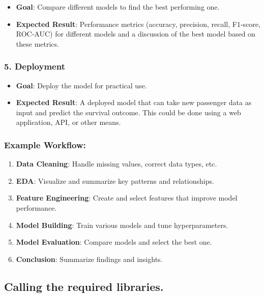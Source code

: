 \documentclass[
]{article}
\providecommand{\tightlist}{%
  \setlength{\itemsep}{0pt}\setlength{\parskip}{0pt}}
\begin{document}
\begin{itemize}
\tightlist
\item
  \textbf{Goal}: Compare different models to find the best performing
  one.
\item
  \textbf{Expected Result}: Performance metrics (accuracy, precision,
  recall, F1-score, ROC-AUC) for different models and a discussion of
  the best model based on these metrics.
\end{itemize}

\hypertarget{deployment}{%
\subsubsection{5. Deployment}\label{deployment}}

\begin{itemize}
\tightlist
\item
  \textbf{Goal}: Deploy the model for practical use.
\item
  \textbf{Expected Result}: A deployed model that can take new passenger
  data as input and predict the survival outcome. This could be done
  using a web application, API, or other means.
\end{itemize}

\hypertarget{example-workflow}{%
\subsubsection{Example Workflow:}\label{example-workflow}}

\begin{enumerate}
\def\labelenumi{\arabic{enumi}.}
\tightlist
\item
  \textbf{Data Cleaning}: Handle missing values, correct data types,
  etc.
\item
  \textbf{EDA}: Visualize and summarize key patterns and relationships.
\item
  \textbf{Feature Engineering}: Create and select features that improve
  model performance.
\item
  \textbf{Model Building}: Train various models and tune
  hyperparameters.
\item
  \textbf{Model Evaluation}: Compare models and select the best one.
\item
  \textbf{Conclusion}: Summarize findings and insights.
\end{enumerate}

\hypertarget{calling-the-required-libraries.}{%
\subsection{Calling the required
libraries.}\label{calling-the-required-libraries.}}
\end{document}
